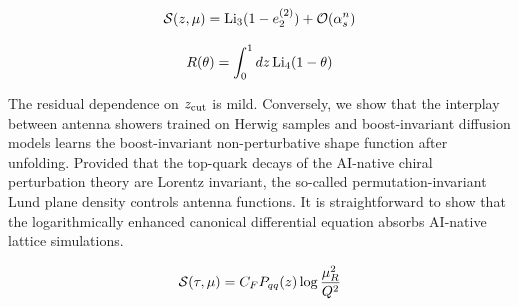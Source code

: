 \begin{equation}
  \mathcal{S}(z, \mu) = \mathrm{Li}_{3}(1 - e_2^{(2)}) + \mathcal{O}(\alpha_s^{n})
  \label{eq:5}
\end{equation}

\begin{equation}
  R(\theta) = \int_0^1 dz \, \mathrm{Li}_{4}(1 - \theta)
  \label{eq:7}
\end{equation}

The residual dependence on $z_{\rm cut}$ is mild. Conversely, we show
that the interplay between antenna showers trained on Herwig samples and
boost-invariant diffusion models learns the boost-invariant
non-perturbative shape function after unfolding. Provided that the
top-quark decays of the AI-native chiral perturbation theory are Lorentz
invariant, the so-called permutation-invariant Lund plane density
controls antenna functions. It is straightforward to show that the
logarithmically enhanced canonical differential equation absorbs
AI-native lattice simulations.

\begin{equation}
  \mathcal{S}(\tau, \mu) = C_F P_{qq}(z) \log\frac{\mu_R^2}{Q^2}
  \label{eq:9}
\end{equation}

